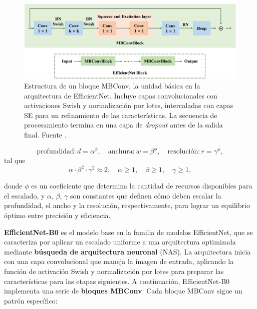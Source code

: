 \begin{figure}
	\centering
	\includegraphics[width=140mm]{img/mbconv.jpg}
	\caption{Estructura de un bloque MBConv, la unidad básica en la arquitectura de EfficientNet.  Incluye capas convolucionales con activaciones Swish y normalización por lotes, intercaladas con capas SE para un refinamiento de las características. La secuencia de procesamiento termina en una capa de \textit{dropout} antes de la salida final. Fuente \cite{TANG2024105605}.}
\end{figure}

\begin{equation}
	\text{profundidad}: d = \alpha^\phi, \quad \text{anchura}: w = \beta^\phi, \quad \text{resolución}: r = \gamma^\phi,
\end{equation}
tal que 
\[
\alpha \cdot \beta^2 \cdot \gamma^2 \approx 2, \quad \alpha \geq 1, \quad \beta \geq 1, \quad \gamma \geq 1,
\]

donde \(\phi\) es un coeficiente que determina la cantidad de recursos disponibles para el escalado, y \(\alpha\), \(\beta\), \(\gamma\) son constantes que definen cómo deben escalar la profundidad, el ancho y la resolución, respectivamente, para lograr un equilibrio óptimo entre precisión y eficiencia.

\textbf{EfficientNet-B0} es el modelo base en la familia de modelos EfficientNet, que se caracteriza por aplicar un escalado uniforme a una arquitectura optimizada mediante \textbf{búsqueda de arquitectura neuronal} (NAS). La arquitectura inicia con una capa convolucional que maneja la imagen de entrada, aplicando la función de activación Swish y normalización por lotes para preparar las características para las etapas siguientes. A continuación, EfficientNet-B0 implementa una serie de \textbf{bloques MBConv}. Cada bloque MBConv sigue un patrón específico:

